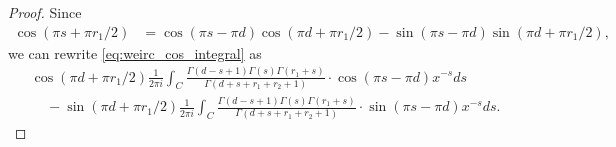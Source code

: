 \documentclass[]{article}
\begin{document}
\begin{proof} Since \begin{equation}
\begin{split}
\cos(\pi s + \pi r_1 / 2)  %
&= \cos (\pi s - \pi d) \cos(\pi d + \pi r_1 / 2) -\sin (\pi s - \pi d) \sin(\pi d + \pi r_1 / 2),
\end{split}
\end{equation} we %
can rewrite \eqref{eq:weirc_cos_integral} as 
\begin{equation}\label{eq:integrals_from_inverse_Mellin_with_trigonometry}
\begin{split}
&\cos(\pi d + \pi r_1 / 2) \frac{1}{2 \pi i}  \int_{C} \frac{   \Gamma(d-s+1)   \Gamma(s) \Gamma(r_1 + s) }{\Gamma (d+s+r_1+r_2+1)  }        \cdot   \cos (\pi s - \pi d)   x^{-s}  ds \\
&  \ \ \ \ \  -  \sin(\pi d + \pi r_1 / 2) \frac{1}{2 \pi i}  \int_{C}\frac{   \Gamma(d-s+1)   \Gamma(s) \Gamma(r_1 + s) }{\Gamma (d+s+r_1+r_2+1)  }        \cdot   \sin (\pi s - \pi d)    x^{-s}  ds .
\end{split}
\end{equation}



\end{proof}
\end{document}
